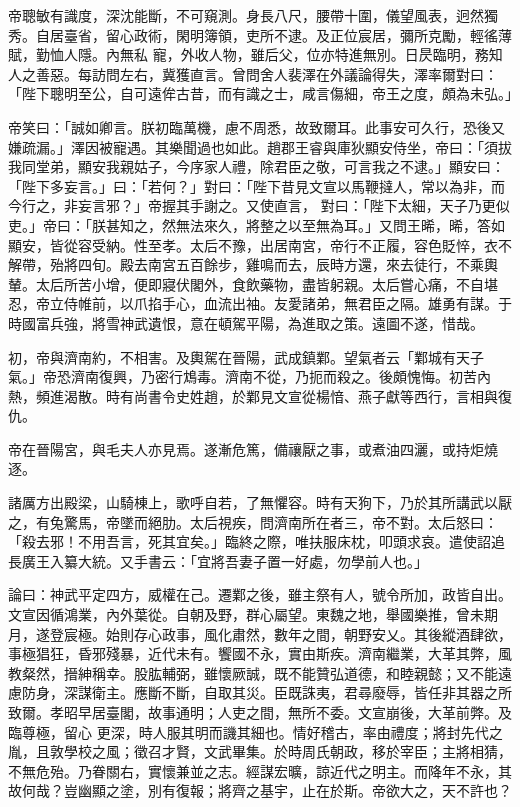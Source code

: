 \begin{pinyinscope}
 帝聰敏有識度，深沈能斷，不可窺測。身長八尺，腰帶十圍，儀望風表，迥然獨秀。自居臺省，留心政術，閑明簿領，吏所不逮。及正位宸居，彌所克勵，輕徭薄賦，勤恤人隱。內無私
 寵，外收人物，雖后父，位亦特進無別。日昃臨明，務知人之善惡。每訪問左右，冀獲直言。曾問舍人裴澤在外議論得失，澤率爾對曰：「陛下聰明至公，自可遠侔古昔，而有識之士，咸言傷細，帝王之度，頗為未弘。」



 帝笑曰：「誠如卿言。朕初臨萬機，慮不周悉，故致爾耳。此事安可久行，恐後又嫌疏漏。」澤因被寵遇。其樂聞過也如此。趙郡王睿與庫狄顯安侍坐，帝曰：「須拔我同堂弟，顯安我親姑子，今序家人禮，除君臣之敬，可言我之不逮。」顯安曰：「陛下多妄言。」曰：「若何？」對曰：「陛下昔見文宣以馬鞭撻人，常以為非，而今行之，非妄言邪？」帝握其手謝之。又使直言，
 對曰：「陛下太細，天子乃更似吏。」帝曰：「朕甚知之，然無法來久，將整之以至無為耳。」又問王晞，晞，答如顯安，皆從容受納。性至孝。太后不豫，出居南宮，帝行不正履，容色貶悴，衣不解帶，殆將四旬。殿去南宮五百餘步，雞鳴而去，辰時方還，來去徒行，不乘輿輦。太后所苦小增，便即寢伏閣外，食飲藥物，盡皆躬親。太后嘗心痛，不自堪忍，帝立侍帷前，以爪掐手心，血流出袖。友愛諸弟，無君臣之隔。雄勇有謀。于時國富兵強，將雪神武遺恨，意在頓駕平陽，為進取之策。遠圖不遂，惜哉。



 初，帝與濟南約，不相害。及輿駕在晉陽，武成鎮鄴。望氣者云「鄴城有天子
 氣。」帝恐濟南復興，乃密行鴆毒。濟南不從，乃扼而殺之。後頗愧悔。初苦內熱，頻進渴散。時有尚書令史姓趙，於鄴見文宣從楊愔、燕子獻等西行，言相與復仇。



 帝在晉陽宮，與毛夫人亦見焉。遂漸危篤，備禳厭之事，或煮油四灑，或持炬燒逐。



 諸厲方出殿梁，山騎棟上，歌呼自若，了無懼容。時有天狗下，乃於其所講武以厭之，有兔驚馬，帝墜而絕肋。太后視疾，問濟南所在者三，帝不對。太后怒曰：「殺去邪！不用吾言，死其宜矣。」臨終之際，唯扶服床枕，叩頭求哀。遣使詔追長廣王入纂大統。又手書云：「宜將吾妻子置一好處，勿學前人也。」



 論曰：神武平定四方，威權在己。遷鄴之後，雖主祭有人，號令所加，政皆自出。文宣因循鴻業，內外葉從。自朝及野，群心屬望。東魏之地，舉國樂推，曾未期月，遂登宸極。始則存心政事，風化肅然，數年之間，朝野安乂。其後縱酒肆欲，事極猖狂，昏邪殘暴，近代未有。饗國不永，實由斯疾。濟南繼業，大革其弊，風教粲然，搢紳稱幸。股肱輔弼，雖懷厥誠，既不能贊弘道德，和睦親懿；又不能遠慮防身，深謀衛主。應斷不斷，自取其災。臣既誅夷，君尋廢辱，皆任非其器之所致爾。孝昭早居臺閣，故事通明；人吏之間，無所不委。文宣崩後，大革前弊。及臨尊極，留心
 更深，時人服其明而譏其細也。情好稽古，率由禮度；將封先代之胤，且敦學校之風；徵召才賢，文武畢集。於時周氏朝政，移於宰臣；主將相猜，不無危殆。乃眷關右，實懷兼並之志。經謀宏曠，諒近代之明主。而降年不永，其故何哉？豈幽顯之塗，別有復報；將齊之基宇，止在於斯。帝欲大之，天不許也？



\end{pinyinscope}